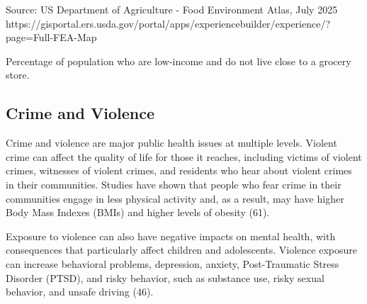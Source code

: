 \documentclass[
  english,
  letterpaper,
]{report}
\begin{document}
\begin{tcolorbox}[enhanced jigsaw, breakable, leftrule=.75mm, title=\textcolor{quarto-callout-note-color}{\faInfo}\hspace{0.5em}{Source}, bottomrule=.15mm, opacityback=0, left=2mm, colback=white, bottomtitle=1mm, coltitle=black, colbacktitle=quarto-callout-note-color!10!white, colframe=quarto-callout-note-color-frame, opacitybacktitle=0.6, toptitle=1mm, titlerule=0mm, arc=.35mm, rightrule=.15mm, toprule=.15mm]

Source: US Department of Agriculture - Food Environment Atlas, July 2025
https://gisportal.ers.usda.gov/portal/apps/experiencebuilder/experience/?page=Full-FEA-Map

\end{tcolorbox}

\begin{tcolorbox}[enhanced jigsaw, breakable, leftrule=.75mm, title=\textcolor{quarto-callout-note-color}{\faInfo}\hspace{0.5em}{Note}, bottomrule=.15mm, opacityback=0, left=2mm, colback=white, bottomtitle=1mm, coltitle=black, colbacktitle=quarto-callout-note-color!10!white, colframe=quarto-callout-note-color-frame, opacitybacktitle=0.6, toptitle=1mm, titlerule=0mm, arc=.35mm, rightrule=.15mm, toprule=.15mm]

Percentage of population who are low-income and do not live close to a
grocery store.

\end{tcolorbox}

\subsection{Crime and Violence}\label{crime-and-violence}

Crime and violence are major public health issues at multiple levels.
Violent crime can affect the quality of life for those it reaches,
including victims of violent crimes, witnesses of violent crimes, and
residents who hear about violent crimes in their communities. Studies
have shown that people who fear crime in their communities engage in
less physical activity and, as a result, may have higher Body Mass
Indexes (BMIs) and higher levels of obesity (61).

Exposure to violence can also have negative impacts on mental health,
with consequences that particularly affect children and adolescents.
Violence exposure can increase behavioral problems, depression, anxiety,
Post-Traumatic Stress Disorder (PTSD), and risky behavior, such as
substance use, risky sexual behavior, and unsafe driving (46).
\end{document}
